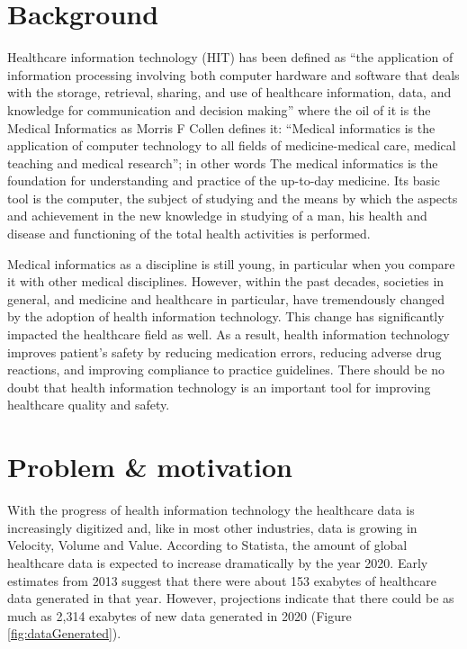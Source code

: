 \section{Background}
Healthcare information technology (HIT) has been defined as \enquote{the application of information processing involving both computer hardware and software that deals with the storage, retrieval, sharing, and use of healthcare information, data, and knowledge for communication and decision making\cite{brailer2004decade}} where the oil of it is the Medical Informatics as Morris F Collen defines it: \enquote{Medical informatics is the application of computer technology to all fields of medicine-medical care, medical teaching and medical research}; in other words The medical informatics is the foundation for understanding and practice of the up-to-day medicine. Its basic tool is the computer, the subject of studying and the means by which the aspects and achievement in the new knowledge in studying of a man, his health and disease and functioning of the total health activities is performed\cite{masic2013history}.

Medical informatics as a discipline is still young, in particular when you compare it with other medical disciplines. However, within the past decades, societies in general, and medicine and healthcare in particular, have tremendously changed by the adoption of health information technology. This change has significantly impacted the healthcare field as well\cite{haux2010medical}. As a result,  health information technology improves patient’s safety by reducing medication errors, reducing adverse drug reactions, and improving compliance to practice guidelines. There should be no doubt that health information technology is an important tool for improving healthcare quality and safety\cite{alotaibi2017impact}.


\section{Problem \& motivation}
With the progress of health information technology the healthcare data is increasingly digitized and, like in most other industries, data is growing in Velocity, Volume and Value. According to Statista\cite{HealthcareDataVolume}, the amount of global healthcare data is expected to increase dramatically by the year 2020. Early estimates from 2013 suggest that there were about 153 exabytes of healthcare data generated in that year. However, projections indicate that there could be as much as 2,314 exabytes of new data generated in 2020 (Figure \ref{fig:dataGenerated}).

